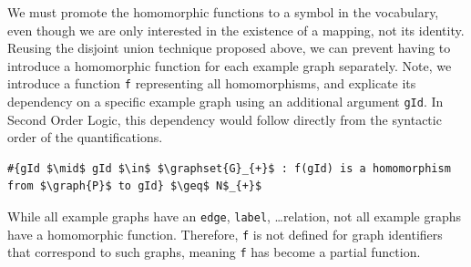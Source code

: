 We must promote the homomorphic functions to a symbol in the vocabulary, even though we are only interested in the existence of a mapping, not its identity.
Reusing the disjoint union technique proposed above, we can prevent having to introduce a homomorphic function for each example graph separately.
Note, we introduce a function \verb|f| representing all homomorphisms, and explicate its dependency on a specific example graph using an additional argument \lstinline{gId}.
In Second Order Logic, this dependency would follow directly from the syntactic order of the quantifications.

\begin{center}
\begin{minipage}{0.80\linewidth}
\vspace{-1em}
\begin{lstlisting}[style=small,mathescape, caption=Globalized existential functions, label=lst:GlobalizeExistentialQuantifications]
#{gId $\mid$ gId $\in$ $\graphset{G}_{+}$ : f(gId) is a homomorphism from $\graph{P}$ to gId} $\geq$ N$_{+}$
\end{lstlisting}
\vspace{-1em}
\end{minipage}
\end{center}
While all example graphs have an \lstinline{edge}, \lstinline{label}, \ldots relation, not all example graphs have a homomorphic function.
Therefore, \lstinline{f} is not defined for graph identifiers that correspond to such graphs, meaning \lstinline{f} has become a partial function.


